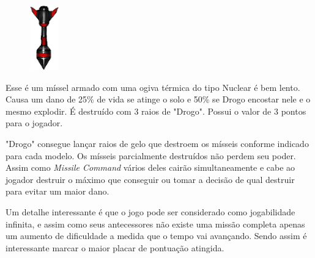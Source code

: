 \documentclass[a4paper,11pt]{article}
\begin{document}
\begin{minipage}{\textwidth}
	\vspace{5pt}
	\begin{figure}
		\vspace{-\baselineskip}
		\includegraphics[width=0.5\linewidth]{imagens/pi-Misseis4.png} 
	\end{figure}
	Esse é um míssel armado com uma ogiva térmica do tipo Nuclear é bem lento. Causa um dano de 25\% de vida se atinge o solo e 50\% se Drogo encostar nele e o mesmo explodir. É destruído com 3 raios de "Drogo". Possui o valor de 3 pontos para o jogador.
	\vspace{20pt}
\end{minipage}

"Drogo" consegue lançar raios de gelo que destroem os mísseis conforme indicado para cada modelo. Os mísseis parcialmente destruídos não perdem seu poder. Assim como \textit{Missile Command} vários deles cairão simultaneamente e cabe ao jogador destruir o máximo que conseguir ou tomar a decisão de qual destruir para evitar um maior dano.

Um detalhe interessante é que o jogo pode ser considerado como jogabilidade infinita, e assim como seus antecessores não existe uma missão completa apenas um aumento de dificuldade a medida que o tempo vai avançando. Sendo assim é interessante marcar o maior placar de pontuação atingida.
\end{document}
